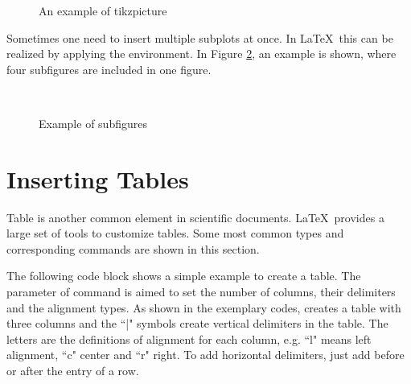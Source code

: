 	\begin{figure}[h!]
		\centering
		\caption{An example of tikzpicture}
		\label{tikzpic}
	\end{figure}

	Sometimes one need to insert multiple subplots at once. In \LaTeX~this can be realized by applying the {\color{blue}{\verb|\subfloat|}} environment. In Figure \ref{subfloats}, an example is shown, where four subfigures are included in one figure.
	
	\begin{figure}[h!]
		\centering
		 \hspace{1cm}
		 \\
		\caption{Example of subfigures}\label{subfloats}
	\end{figure}

\newpage
	
\section{Inserting Tables}

	Table is another common element in scientific documents. \LaTeX~provides a large set of tools to customize tables. Some most common types and corresponding commands are shown in this section.
	
	The following code block shows a simple example to create a table. The parameter of command {\color{blue}{\verb|tabular|}} is aimed to set the number of columns, their delimiters and the alignment types. As shown in the exemplary codes, {} creates a table with three columns and the ``|" symbols create vertical delimiters in the table. The letters are the definitions of alignment for each column, e.g. ``l" means left alignment, ``c" center and ``r" right. To add horizontal delimiters, just add {\color{blue}{\verb|\hline|}} before or after the entry of a row. 
	
